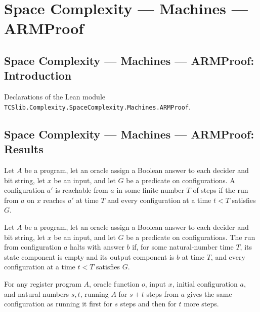 \section{Space Complexity --- Machines --- ARMProof}
\subsection*{Space Complexity --- Machines --- ARMProof: Introduction}

Declarations of the Lean module \texttt{TCSlib.Complexity.SpaceComplexity.Machines.ARMProof}.

\subsection*{Space Complexity --- Machines --- ARMProof: Results}

\begin{definition}
\label{Complexity.LogProg.AReach}
\leanok
{}
Let $A$ be a program, let an oracle assign a Boolean answer to each decider and bit
string, let $x$ be an input, and let $G$ be a predicate on configurations. A
configuration $a'$ is reachable from $a$ in some finite number $T$ of steps if the run
from $a$ on $x$ reaches $a'$ at time $T$ and every configuration at a time $t<T$
satisfies $G$.
\end{definition}

\begin{definition}
\label{Complexity.LogProg.AHalt}
\leanok
{}
Let $A$ be a program, let an oracle assign a Boolean answer to each decider and bit
string, let $x$ be an input, and let $G$ be a predicate on configurations. The run from
configuration $a$ halts with answer $b$ if, for some natural-number time $T$, its state
component is empty and its output component is $b$ at time $T$, and every configuration
at a time $t<T$ satisfies $G$.
\end{definition}

\begin{lemma}
\label{Complexity.LogProg.arun_add}
\leanok
{}
For any register program $A$, oracle function $o$, input $x$, initial configuration $a$,
and natural numbers $s,t$, running $A$ for $s+t$ steps from $a$ gives the same
configuration as running it first for $s$ steps and then for $t$ more steps.
\end{lemma}

